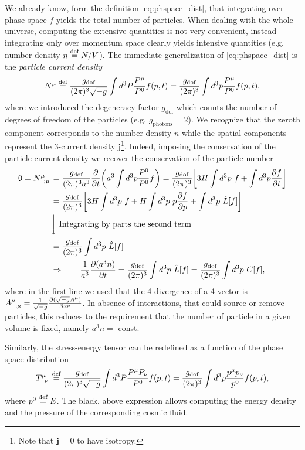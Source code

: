 We already know, form the definition \eqref{eq:phspace_dist}, that integrating over phase space $f$ yields the total number of particles. When dealing with the whole universe, computing the extensive quantities is not very convenient, instead integrating only over momentum space clearly yields intensive quantities (e.g. number density $n\stackrel{\text{def}}{=} N/V$). The immediate generalization of \eqref{eq:phspace_dist} is the \emph{particle current density}
\begin{equation}
    N^\mu\stackrel{\text{def}}{=}\frac{g_\text{dof}}{(2\pi)^3\sqrt{-g}}\int d^3P\frac{P^\mu}{P^0} f(p,t)=\frac{g_\text{dof}}{(2\pi)^3}\int d^3p\frac{P^\mu}{P^0} f(p,t),
    \label{eq:current_density}
\end{equation}
where we introduced the degeneracy factor $g_\text{dof}$ which counts the number of degrees of freedom of the particles (e.g. $g_\text{photons}=2$).  We recognize that the zeroth component corresponds to the number density $n$ while the spatial components represent the 3-current density $\mathbf j$\footnote{Note that $\mathbf j=0$ to have isotropy.}. Indeed, imposing the conservation of the particle current density we recover the conservation of the particle number
\begin{align*}
    0=\tensor{N}{^\mu_;_\mu}&=\frac{g_\text{dof}}{(2\pi)^3a^3}\frac{\partial }{\partial t}\bigg(a^3\int d^3p\frac{P^0}{P^0}f\bigg)=\frac{g_\text{dof}}{(2\pi)^3}\bigg[3H\int d^3p\ f+ \int d^3p\frac{\partial f}{\partial t}\bigg]\\&=\frac{g_\text{dof}}{(2\pi)^3}\bigg[3H\int d^3p\ f+H\int d^3p\ p\frac{\partial f}{\partial p}+ \int d^3p\ \hat L[f]\bigg]\\
    &\bigg\downarrow\ \text{Integrating by parts the second term}\\
    &=\frac{g_\text{dof}}{(2\pi)^3}\int d^3p\ \hat L[f]\\
    &\Rightarrow\qquad \frac{1}{a^3}\frac{\partial (a^3n)}{\partial t}=\frac{g_\text{dof}}{(2\pi)^3}\int d^3p\ \hat L[f]=\frac{g_\text{dof}}{(2\pi)^3}\int d^3p\ C[f],
\end{align*} 
where in the first line we used that the 4-divergence of a 4-vector is $\tensor{A}{^\mu_;_\mu}=\tfrac{1}{\sqrt{-g}}\tfrac{\partial (\sqrt{-g}A^\mu)}{\partial x^\mu}$. In absence of interactions, that could source or remove particles, this reduces to the requirement that the number of particle in a given volume is fixed, namely $a^3 n=$ const.

Similarly, the stress-energy tensor can be redefined as a function of the phase space distribution
\begin{equation}
    \tensor{T}{^\mu_\nu}\defeq \frac{g_\text{dof}}{(2\pi)^3\sqrt{-g}}\int d^3P\frac{P^\mu P_\nu}{P^0}f(p,t)=\frac{g_\text{dof}}{(2\pi)^3}\int d^3p\frac{p^\mu p_\nu}{p^0}f(p,t),
    \label{eq:SressEnergyT_phasespace}
\end{equation}
where $p^0\stackrel{\text{def}}{=} E$. The black, above expression allows computing the energy density and the pressure of the corresponding cosmic fluid.

